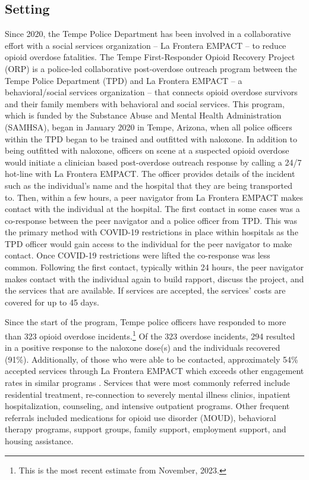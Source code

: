 \subsection{Setting}

Since 2020, the Tempe Police Department has been involved in a collaborative effort with a social services organization -- La Frontera EMPACT -- to reduce opioid overdose fatalities. The Tempe First-Responder Opioid Recovery Project (ORP) is a police-led collaborative post-overdose outreach program between the Tempe Police Department (TPD) and La Frontera EMPACT -- a behavioral/social services organization -- that connects opioid overdose survivors and their family members with behavioral and social services. This program, which is funded by the Substance Abuse and Mental Health Administration (SAMHSA), began in January 2020 in Tempe, Arizona, when all police officers within the TPD began to be trained and outfitted with naloxone. In addition to being outfitted with naloxone, officers on scene at a suspected opioid overdose would initiate a clinician based post-overdose outreach response by calling a 24/7 hot-line with La Frontera EMPACT. The officer provides details of the incident such as the individual's name and the hospital that they are being transported to. Then, within a few hours, a peer navigator from La Frontera EMPACT makes contact with the individual at the hospital. The first contact in some cases was a co-response between the peer navigator and a police officer from TPD. This was the primary method with COVID-19 restrictions in place within hospitals as the TPD officer would gain access to the individual for the peer navigator to make contact. Once COVID-19 restrictions were lifted the co-response was less common. Following the first contact, typically within 24 hours, the peer navigator makes contact with the individual again to build rapport, discuss the project, and the services that are available. If services are accepted, the services' costs are covered for up to 45 days. 

Since the start of the program, Tempe police officers have responded to more than 323 opioid overdose incidents.\footnote{This is the most recent estimate from November, 2023.} Of the 323 overdose incidents, 294 resulted in a positive response to the naloxone dose(s) and the individuals recovered (91\%). Additionally, of those who were able to be contacted, approximately 54\% accepted services through La Frontera EMPACT which exceeds other engagement rates in similar programs \parencite{dahlem_beyond_2017, wagner_training_2016}. Services that were most commonly referred include residential treatment, re-connection to severely mental illness clinics, inpatient hospitalization, counseling, and intensive outpatient programs. Other frequent referrals included medications for opioid use disorder (MOUD), behavioral therapy programs, support groups, family support, employment support, and housing assistance.

